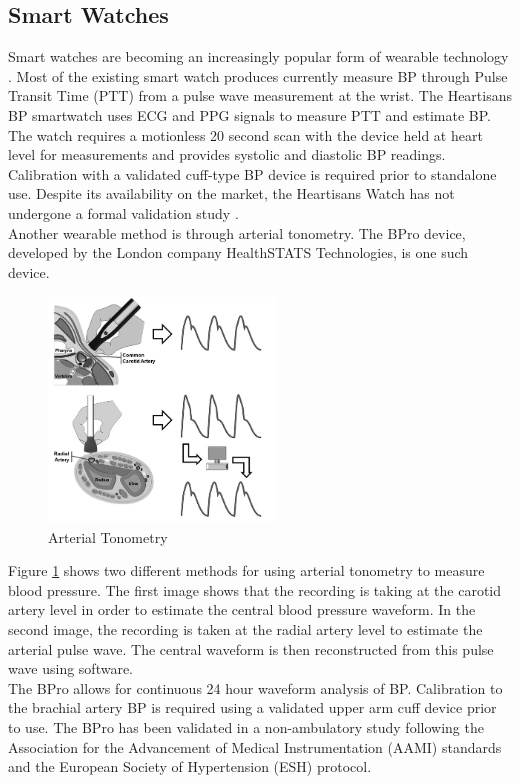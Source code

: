 \documentclass[11pt, a4paper]{article}
\begin{document}
\subsection{Smart Watches}
Smart watches are becoming an increasingly popular form of wearable technology \cite{Bard2019}. Most of the existing smart watch produces currently measure BP through Pulse Transit Time (PTT) from a pulse wave measurement at the wrist. The Heartisans BP smartwatch uses ECG and PPG signals to measure PTT and estimate BP. The watch requires a motionless 20 second scan with the device held at heart level for measurements and provides systolic and diastolic BP readings. Calibration with a validated cuff-type BP device is required prior to standalone use. Despite its availability on the market, the Heartisans Watch has not undergone a formal validation study \cite{Bard2019}. \\ \newline \noindent Another wearable method  is  through  arterial  tonometry. The BPro device, developed by the London company HealthSTATS Technologies, is one such device. \begin{figure}[H]
    \centering
    \includegraphics[width=6cm,height=6cm,keepaspectratio]{Figures/arterial.png}
    \caption{Arterial Tonometry}
    \label{tonometry}
\end{figure} \noindent Figure \ref{tonometry} shows two different methods for using arterial tonometry to measure blood pressure. The first image shows that the recording is taking at the carotid artery level in order to estimate the central blood pressure waveform. In the second image, the recording is taken at the radial artery level to estimate the arterial pulse wave. The central waveform is then reconstructed from this pulse wave using software. \\ \newline \noindent The BPro allows for continuous  24 hour  waveform  analysis  of  BP. Calibration to the brachial artery BP is required using a validated upper arm cuff device prior to use. The BPro has been validated in a non-ambulatory study following the Association for the Advancement of Medical Instrumentation (AAMI) standards and the European Society of Hypertension (ESH) protocol.
\end{document}
